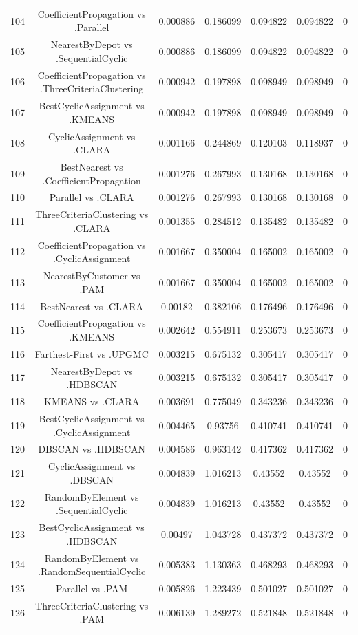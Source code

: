\documentclass[a4paper,10pt]{article}
\begin{document}
\begin{landscape}
\begin{table}[!htp]
\begin{tabular}{ccccccc}
104&CoefficientPropagation vs .Parallel&0.000886&0.186099&0.094822&0.094822&0\\
105&NearestByDepot vs .SequentialCyclic&0.000886&0.186099&0.094822&0.094822&0\\
106&CoefficientPropagation vs .ThreeCriteriaClustering&0.000942&0.197898&0.098949&0.098949&0\\
107&BestCyclicAssignment vs .KMEANS&0.000942&0.197898&0.098949&0.098949&0\\
108&CyclicAssignment vs .CLARA&0.001166&0.244869&0.120103&0.118937&0\\
109&BestNearest vs .CoefficientPropagation&0.001276&0.267993&0.130168&0.130168&0\\
110&Parallel vs .CLARA&0.001276&0.267993&0.130168&0.130168&0\\
111&ThreeCriteriaClustering vs .CLARA&0.001355&0.284512&0.135482&0.135482&0\\
112&CoefficientPropagation vs .CyclicAssignment&0.001667&0.350004&0.165002&0.165002&0\\
113&NearestByCustomer vs .PAM&0.001667&0.350004&0.165002&0.165002&0\\
114&BestNearest vs .CLARA&0.00182&0.382106&0.176496&0.176496&0\\
115&CoefficientPropagation vs .KMEANS&0.002642&0.554911&0.253673&0.253673&0\\
116&Farthest-First vs .UPGMC&0.003215&0.675132&0.305417&0.305417&0\\
117&NearestByDepot vs .HDBSCAN&0.003215&0.675132&0.305417&0.305417&0\\
118&KMEANS vs .CLARA&0.003691&0.775049&0.343236&0.343236&0\\
119&BestCyclicAssignment vs .CyclicAssignment&0.004465&0.93756&0.410741&0.410741&0\\
120&DBSCAN vs .HDBSCAN&0.004586&0.963142&0.417362&0.417362&0\\
121&CyclicAssignment vs .DBSCAN&0.004839&1.016213&0.43552&0.43552&0\\
122&RandomByElement vs .SequentialCyclic&0.004839&1.016213&0.43552&0.43552&0\\
123&BestCyclicAssignment vs .HDBSCAN&0.00497&1.043728&0.437372&0.437372&0\\
124&RandomByElement vs .RandomSequentialCyclic&0.005383&1.130363&0.468293&0.468293&0\\
125&Parallel vs .PAM&0.005826&1.223439&0.501027&0.501027&0\\
126&ThreeCriteriaClustering vs .PAM&0.006139&1.289272&0.521848&0.521848&0\\

\end{tabular}
\end{table}
\end{landscape}
\end{document}
